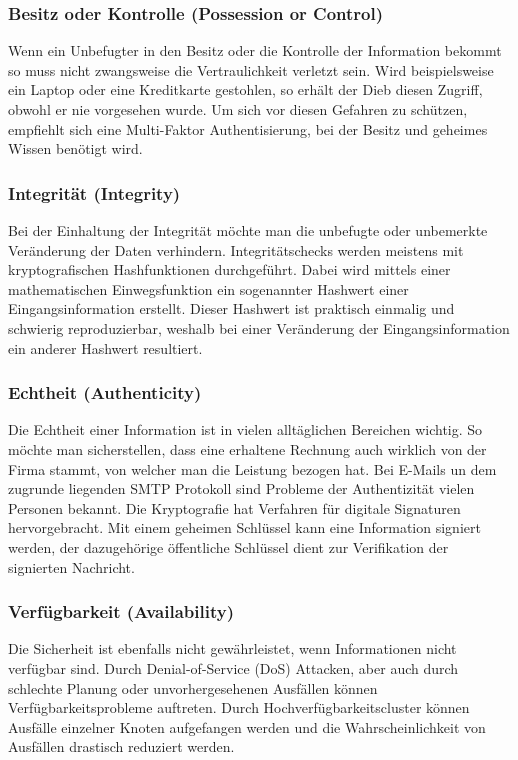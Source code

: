 \subsubsection{Besitz oder Kontrolle (Possession or Control)}
Wenn ein Unbefugter in den Besitz oder die Kontrolle der Information bekommt so muss nicht zwangsweise die Vertraulichkeit verletzt sein. Wird beispielsweise ein Laptop oder eine Kreditkarte gestohlen, so erhält der Dieb diesen Zugriff, obwohl er nie vorgesehen wurde. Um sich vor diesen Gefahren zu schützen, empfiehlt sich eine Multi-Faktor Authentisierung, bei der Besitz und geheimes Wissen benötigt wird. 
\subsubsection{Integrität (Integrity)}
Bei der Einhaltung der Integrität möchte man die unbefugte oder unbemerkte Veränderung der Daten verhindern. Integritätschecks werden meistens mit kryptografischen Hashfunktionen durchgeführt. Dabei wird mittels einer mathematischen Einwegsfunktion ein sogenannter Hashwert einer Eingangsinformation erstellt. Dieser Hashwert ist praktisch einmalig und schwierig reproduzierbar, weshalb bei einer Veränderung der Eingangsinformation ein anderer Hashwert resultiert. 
\subsubsection{Echtheit (Authenticity)}
Die Echtheit einer Information ist in vielen alltäglichen Bereichen wichtig. So möchte man sicherstellen, dass eine erhaltene Rechnung auch wirklich von der Firma stammt, von welcher man die Leistung bezogen hat. Bei E-Mails un dem zugrunde liegenden SMTP Protokoll sind Probleme der Authentizität vielen Personen bekannt. Die Kryptografie hat Verfahren für digitale Signaturen hervorgebracht. Mit einem geheimen Schlüssel kann eine Information signiert werden, der dazugehörige öffentliche Schlüssel dient zur Verifikation der signierten Nachricht.
\subsubsection{Verfügbarkeit (Availability)}
Die Sicherheit ist ebenfalls nicht gewährleistet, wenn Informationen nicht verfügbar sind. Durch Denial-of-Service (DoS) Attacken, aber auch durch schlechte Planung oder unvorhergesehenen Ausfällen können Verfügbarkeitsprobleme auftreten. Durch Hochverfügbarkeitscluster können Ausfälle einzelner Knoten aufgefangen werden und die Wahrscheinlichkeit von Ausfällen drastisch reduziert werden.
